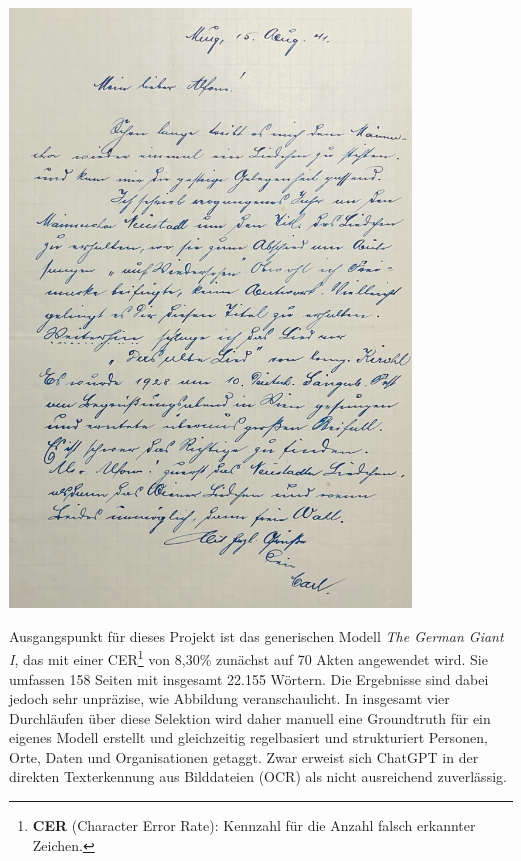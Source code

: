 \documentclass[12pt, a4paper, ngerman, bidi=default]{article}
\begin{document}
  \begin{minipage}[t]{0.43\textwidth}
    \centering
    \vspace*{0cm} %
  \includegraphics[width=0.8\textwidth]{./assets/Images/Akte_076_S001.jpg}
  \label{fig:Carl-handschrift}
\end{minipage}
\vspace{1em}

Ausgangspunkt für dieses Projekt ist das generischen Modell \textit{The German Giant I}, 
das mit einer CER\footnote{\textbf{CER} (Character Error Rate): Kennzahl für die Anzahl falsch erkannter Zeichen.} von 8,30\% zunächst auf 70 Akten angewendet wird. 
Sie umfassen 158 Seiten mit insgesamt 22.155 Wörtern. Die Ergebnisse
sind dabei jedoch sehr unpräzise, wie Abbildung  veranschaulicht. 
In insgesamt vier Durchläufen über diese Selektion wird daher manuell eine Groundtruth für ein eigenes Modell erstellt und gleichzeitig regelbasiert und strukturiert Personen, Orte, Daten und
Organisationen getaggt. Zwar erweist sich ChatGPT in der direkten Texterkennung aus Bilddateien (OCR) als nicht ausreichend zuverlässig. 
\end{document}
